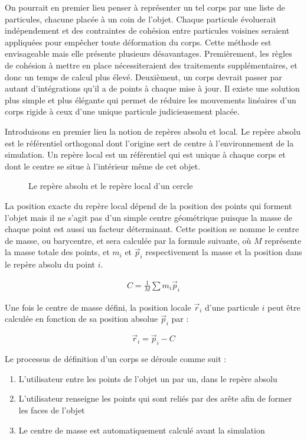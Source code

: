 On pourrait en premier lieu penser à représenter un tel corps par une liste de particules, chacune placée à un coin de l'objet. Chaque particule évoluerait indépendement et des contraintes de cohésion entre particules voisines seraient appliquées pour empêcher toute déformation du corps. Cette méthode est envisageable mais elle présente plusieurs désavantages. Premièrement, les règles de cohésion à mettre en place nécessiteraient des traitements supplémentaires, et donc un temps de calcul plus élevé. Deuxièment, un corps devrait passer par autant d'intégrations qu'il a de points à chaque mise à jour. Il existe une solution plus simple et plus élégante qui permet de réduire les mouvements linéaires d'un corps rigide à ceux d'une unique particule judicieusement placée.

Introduisons en premier lieu la notion de repères absolu et local. Le repère absolu est le référentiel orthogonal dont l'origine sert de centre à l'environnement de la simulation. Un repère local est un référentiel qui est unique à chaque corps et dont le centre se situe à l'intérieur même de cet objet.

\begin{figure}
  
  \caption{Le repère absolu et le repère local d'un cercle}
\end{figure}

La position exacte du repère local dépend de la position des points qui forment l'objet mais il ne s'agit pas d'un simple centre géométrique puisque la masse de chaque point est aussi un facteur déterminant. Cette position se nomme le centre de masse, ou barycentre, et sera calculée par la formule suivante, o\`u $M$ représente la masse totale des points, et $m_i$ et $\vec{p}_i$ respectivement la masse et la position dans le repère absolu du point $i$.

\begin{align*}
  C = \frac{1}{M} \sum m_i \vec{p}_i
\end{align*}

Une fois le centre de masse défini, la position locale $\vec{r}_i$ d'une particule $i$ peut être calculée en fonction de sa position absolue $\vec{p}_i$ par :

\[\vec{r}_i = \vec{p}_i - C\]

Le processus de définition d'un corps se déroule comme suit :

\begin{enumerate}
  \item{L'utilisateur entre les points de l'objet un par un, dans le repère absolu}
  \item{L'utilisateur renseigne les points qui sont reliés par des arête afin de former les faces de l'objet}
  \item{Le centre de masse est automatiquement calculé avant la simulation}
\end{enumerate}

